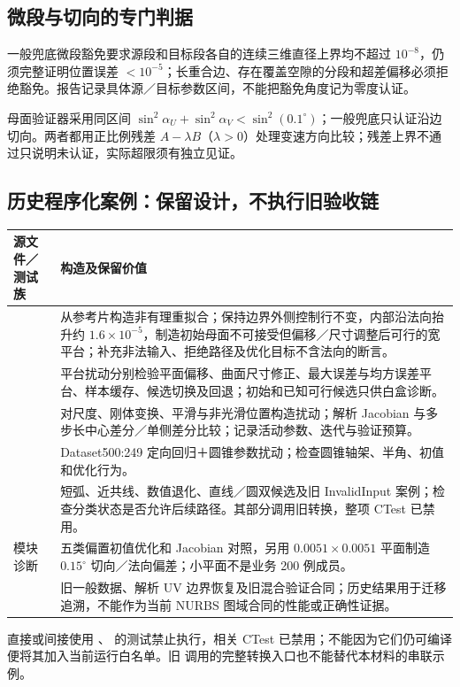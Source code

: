 \documentclass[UTF8,zihao=5,fontset=windows,a4paper]{ctexart}
\begin{document}
\subsection{微段与切向的专门判据}
一般兜底微段豁免要求源段和目标段各自的连续三维直径上界均不超过 $10^{-8}$，仍须完整证明位置误差 $<10^{-5}$；长重合边、存在覆盖空隙的分段和超差偏移必须拒绝豁免。报告记录具体源／目标参数区间，不能把豁免角度记为零度认证。

母面验证器采用同区间 $\sin^2\alpha_U+\sin^2\alpha_V<\sin^2(0.1^\circ)$；一般兜底只认证沿边切向。两者都用正比例残差 $A-\lambda B$（$\lambda>0$）处理变速方向比较；残差上界不通过只说明未认证，实际超限须有独立见证。

\newpage
\subsection{历史程序化案例：保留设计，不执行旧验收链}
\begin{center}\small\renewcommand{\arraystretch}{1.18}
\begin{tabularx}{\linewidth}{@{}p{35mm}Y@{}}\toprule
源文件／测试族 & 构造及保留价值\\\midrule
{}\newline{} & 从参考片构造非有理重拟合；保持边界外侧控制行不变，内部沿法向抬升约 $1.6\times10^{-5}$，制造初始母面不可接受但偏移／尺寸调整后可行的宽平台；补充非法输入、拒绝路径及优化目标不含法向的断言。\\
 & 平台扰动分别检验平面偏移、曲面尺寸修正、最大误差与均方误差平台、样本缓存、候选切换及回退；初始和已知可行候选只供白盒诊断。\\
 & 对尺度、刚体变换、平滑与非光滑位置构造扰动；解析 Jacobian 与多步长中心差分／单侧差分比较；记录活动参数、迭代与验证预算。\\
 & Dataset500:249 定向回归＋圆锥参数扰动；检查圆锥轴架、半角、初值和优化行为。\\
 & 短弧、近共线、数值退化、直线／圆双候选及旧 InvalidInput 案例；检查分类状态是否允许后续路径。其部分调用旧转换，整项 CTest 已禁用。\\
 模块诊断 & 五类偏置初值优化和 Jacobian 对照，另用 $0.0051\times0.0051$ 平面制造 $0.15^\circ$ 切向／法向偏差；小平面不是业务 200 例成员。\\
\newline{}\newline{} & 旧一般数据、解析 UV 边界恢复及旧混合验证合同；历史结果用于迁移追溯，不能作为当前 NURBS 图域合同的性能或正确性证据。\\\bottomrule
\end{tabularx}
\end{center}
直接或间接使用 、 的测试禁止执行，相关 CTest 已禁用；不能因为它们仍可编译便将其加入当前运行白名单。旧  调用的完整转换入口也不能替代本材料的串联示例。
\end{document}
